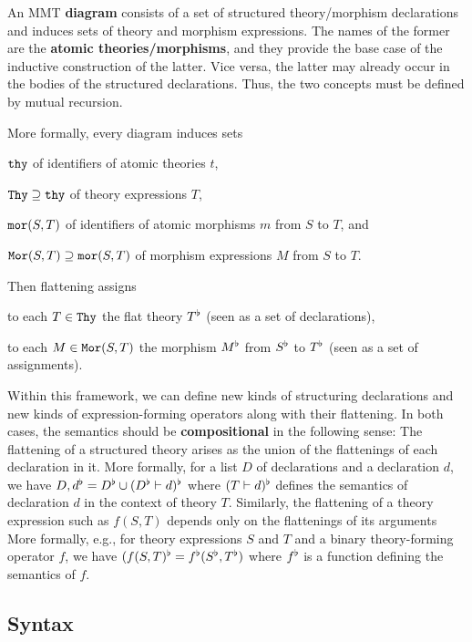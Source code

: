 An MMT \textbf{diagram} consists of a set of structured theory/morphism declarations and induces sets of theory and morphism expressions.
The names of the former are the \textbf{atomic theories/morphisms}, and they provide the base case of the inductive construction of the latter.
Vice versa, the latter may already occur in the bodies of the structured declarations.
Thus, the two concepts must be defined by mutual recursion.

More formally, every diagram induces sets
\begin{compactitem}
 \item $\mathtt{thy}$ of identifiers of atomic theories $t$,
 \item $\mathtt{Thy}\supseteq \mathtt{thy}$ of theory expressions $T$,
 \item $\mathtt{mor}(S,T)$ of identifiers of atomic morphisms $m$ from $S$ to $T$, and
 \item $\mathtt{Mor}(S,T)\supseteq\mathtt{mor}(S,T)$ of morphism expressions $M$ from $S$ to $T$.
\end{compactitem}
Then flattening assigns
\begin{compactitem}
 \item to each $T\in\mathtt{Thy}$ the flat theory $T^\flat$ (seen as a set of declarations),
 \item to each $M\in\mathtt{Mor}(S,T)$ the morphism $M^\flat$ from $S^\flat$ to $T^\flat$ (seen as a set of assignments).
\end{compactitem}

Within this framework, we can define new kinds of structuring declarations and new kinds of expression-forming operators along with their flattening.
In both cases, the semantics should be \textbf{compositional} in the following sense:
The flattening of a structured theory arises as the union of the flattenings of each declaration in it.
More formally, for a list $D$ of declarations and a declaration $d$, we have $D,d^\flat=D^\flat\cup(D^\flat\vdash d)^\flat$ where $(T\vdash d)^\flat$ defines the semantics of declaration $d$ in the context of theory $T$.
Similarly, the flattening of a theory expression such as $f(S,T)$ depends only on the flattenings of its arguments
More formally, e.g., for theory expressions $S$ and $T$ and a binary theory-forming operator $f$, we have $(f(S,T)^\flat=f^\flat(S^\flat,T^\flat)$ where $f^\flat$ is a function defining the semantics of $f$.

\subsection{Syntax}

